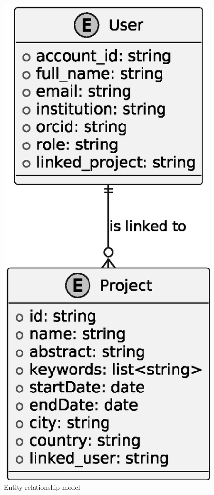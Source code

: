 \documentclass[final]{rc-book-2.14}
\begin{document}
\begin{figure}[htbp]
    \centering
    \includegraphics[scale=0.5]{fig/entity_relationship_model.eps}
    \caption{Entity-relationship model}
    \label{fig:er_model}
\end{figure}
\end{document}
